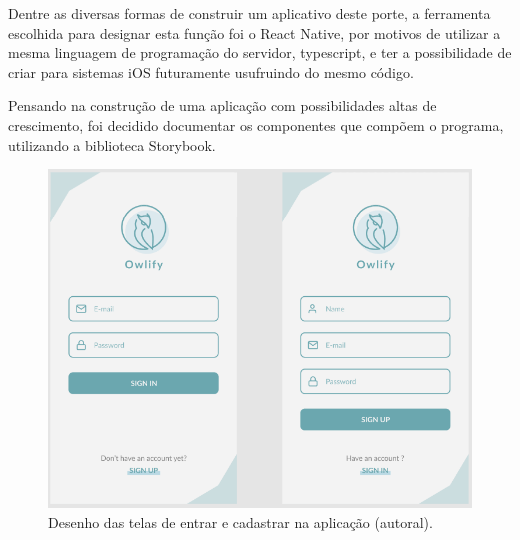 Dentre as diversas formas de construir um aplicativo deste porte, a ferramenta escolhida para designar esta função foi o React Native, por motivos de utilizar a mesma linguagem de programação do servidor, typescript, e ter a possibilidade de criar para sistemas iOS futuramente usufruindo do mesmo código.

Pensando na construção de uma aplicação com possibilidades altas de crescimento, foi decidido documentar os componentes que compõem o programa, utilizando a biblioteca Storybook.

\begin{figure}[H]
  \centering
  \includegraphics[width=.80\textwidth]{assets/example-app-screens.png} 
  \caption{Desenho das telas de entrar e cadastrar na aplicação (autoral).}
  \label{fig:app-screns-login} 
\end{figure}